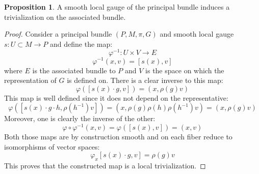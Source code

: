 \documentclass[12pt,a4paper]{report}
\theoremstyle{definition}
\theoremstyle{Theorem}
\newtheorem{Prop}[Def]{Proposition}
\theoremstyle{definition}
\theoremstyle{definition}
\begin{document}
	\begin{Prop}\label{Prop_6.2.3}
		A smooth local gauge of the principal bundle induces a trivialization on the associated bundle.
	\end{Prop}
	\begin{proof}
		Consider a principal bundle $(P,M,\pi,G)$ and smooth local gauge $s:U\subset M\rightarrow P$ and define the map:
		$$\varphi^{-1}:U\times V\rightarrow E$$
		$$\varphi^{-1}(x,v)=[s(x),v]$$
		where $E$ is the associated bundle to $P$ and $V$ is the space on which the representation of $G$ is defined on.
		There is a clear inverse to this map:
		$$\varphi([s(x)\cdot g,v])=(x,\rho(g)v)$$
		This map is well defined since it does not depend on the representative:
		$$\varphi([s(x)\cdot g\cdot h,\rho(h^{-1})v])=(x,\rho(g)\rho(h)\rho(h^{-1})v)=(x,\rho(g)v)$$
		Moreover, one is clearly the inverse of the other:
		$$\varphi\circ \varphi^{-1}(x,v)=\varphi([s(x),v])=(x,v)$$ 
		Both those maps are by construction smooth and on each fiber reduce to isomorphisms of vector spaces:
		$$\varphi_x[s(x)\cdot g,v]=\rho(g)v$$
		This proves that the constructed map is a local trivialization.
	\end{proof}
\end{document}
